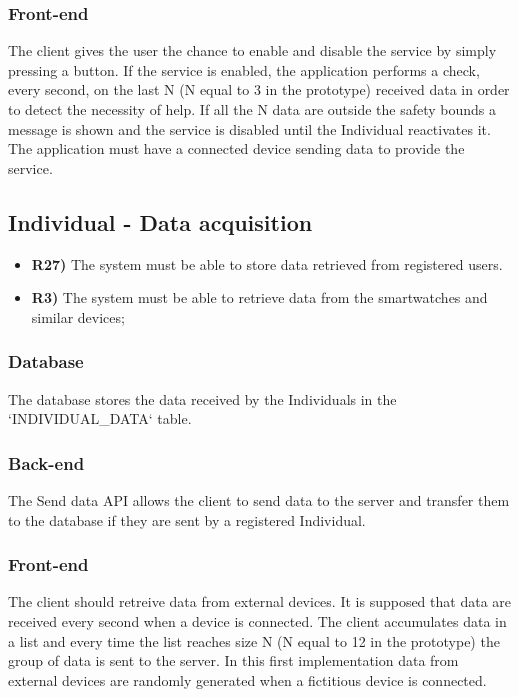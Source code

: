 \subsubsection*{Front-end}
The client gives the user the chance to enable and disable the service by simply pressing a button. If the service is enabled, the application performs a check, every second, on the last N (N equal to 3 in the prototype) received data in order to detect the necessity of help. If all the N data are outside the safety bounds a message is shown and the service is disabled until the Individual reactivates it.
The application must have a connected device sending data to provide the service.


\subsection{Individual - Data acquisition}
\begin{itemize}	
	\item {\color{Green}\textbf{R27)}} The system must be able to store data retrieved from registered users.
	\item {\color{Red}\textbf{R3)}} The system must be able to retrieve data from the smartwatches and similar devices;
\end{itemize}

\subsubsection*{Database}
The database stores the data received by the Individuals in the `INDIVIDUAL\_DATA` table.

\subsubsection*{Back-end}
The Send data API allows the client to send data to the server and transfer them to the database if they are sent by a registered Individual.

\subsubsection*{Front-end}
The client should retreive data from external devices. It is supposed that data are received every second when a device is connected. The client accumulates data in a list and every time the list reaches size N (N equal to 12 in the prototype) the group of data is sent to the server.
In this first implementation data from external devices are randomly generated when a fictitious device is connected.


